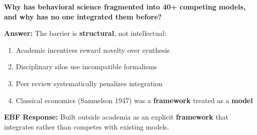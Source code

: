 
\begin{tcolorbox}[colback=red!5!white, colframe=red!75!black,
    title=\textbf{Fundamental Question}]

\textbf{Why has behavioral science fragmented into 40+ competing models, and why
has no one integrated them before?}

\vspace{0.5em}
\textbf{Answer:} The barrier is \textbf{structural}, not intellectual:
\begin{enumerate}[nosep]
    \item Academic incentives reward novelty over synthesis
    \item Disciplinary silos use incompatible formalisms
    \item Peer review systematically penalizes integration
    \item Classical economics (Samuelson 1947) was a \textbf{framework} treated as a \textbf{model}
\end{enumerate}

\textbf{EBF Response:} Built outside academia as an explicit \textbf{framework} that integrates
rather than competes with existing models.

\end{tcolorbox}




